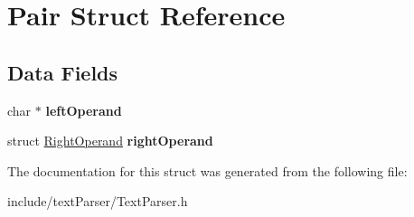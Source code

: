 \hypertarget{struct_pair}{}\section{Pair Struct Reference}
\label{struct_pair}
\subsection*{Data Fields}
\begin{DoxyCompactItemize}
\item 
\hypertarget{struct_pair_a7025d7d52caceaac4ee18d250dc091ed}{}\label{struct_pair_a7025d7d52caceaac4ee18d250dc091ed} 
char $\ast$ {\bfseries left\+Operand}
\item 
\hypertarget{struct_pair_a53499f5efcd7f396b62199c5be2a15d3}{}\label{struct_pair_a53499f5efcd7f396b62199c5be2a15d3} 
struct \hyperlink{struct_right_operand}{Right\+Operand} {\bfseries right\+Operand}
\end{DoxyCompactItemize}


The documentation for this struct was generated from the following file\+:\begin{DoxyCompactItemize}
\item 
include/text\+Parser/Text\+Parser.\+h\end{DoxyCompactItemize}
